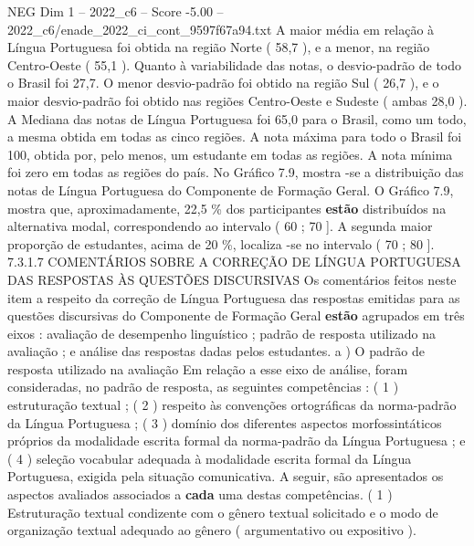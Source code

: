\begin{textsample}{NEG Dim 1 – 2022\_c6 – Score -5.00 – 2022\_c6/enade\_2022\_ci\_cont\_9597f67a94.txt}
A maior média em relação à Língua Portuguesa foi obtida na região Norte ( 58,7 ), e a menor, na região Centro-Oeste ( 55,1 ).
Quanto à variabilidade das notas, o desvio-padrão de todo o Brasil foi 27,7.
O menor desvio-padrão foi obtido na região Sul ( 26,7 ), e o maior desvio-padrão foi obtido nas regiões Centro-Oeste e Sudeste ( ambas 28,0 ).
A Mediana das notas de Língua Portuguesa foi 65,0 para o Brasil, como um todo, a mesma obtida em todas as cinco regiões.
A nota máxima para todo o Brasil foi 100, obtida por, pelo menos, um estudante em todas as regiões.
A nota mínima foi zero em todas as regiões do país.
No Gráfico 7.9, mostra -se a distribuição das notas de Língua Portuguesa do Componente de Formação Geral.
O Gráfico 7.9, mostra que, aproximadamente, 22,5 \% dos participantes \textbf{estão} distribuídos na alternativa modal, correspondendo ao intervalo ( 60 ; 70 ].
A segunda maior proporção de estudantes, acima de 20 \%, localiza -se no intervalo ( 70 ; 80 ]. 7.3.1.7 COMENTÁRIOS SOBRE A CORREÇÃO DE LÍNGUA PORTUGUESA DAS RESPOSTAS ÀS QUESTÕES DISCURSIVAS Os comentários feitos neste item a respeito da correção de Língua Portuguesa das respostas emitidas para as questões discursivas do Componente de Formação Geral \textbf{estão} agrupados em três eixos : avaliação de desempenho linguístico ; padrão de resposta utilizado na avaliação ; e análise das respostas dadas pelos estudantes. a ) O padrão de resposta utilizado na avaliação Em relação a esse eixo de análise, foram consideradas, no padrão de resposta, as seguintes competências : ( 1 ) estruturação textual ; ( 2 ) respeito às convenções ortográficas da norma-padrão da Língua Portuguesa ; ( 3 ) domínio dos diferentes aspectos morfossintáticos próprios da modalidade escrita formal da norma-padrão da Língua Portuguesa ; e ( 4 ) seleção vocabular adequada à modalidade escrita formal da Língua Portuguesa, exigida pela situação comunicativa.
A seguir, são apresentados os aspectos avaliados associados a \textbf{cada} uma destas competências. ( 1 ) Estruturação textual condizente com o gênero textual solicitado e o modo de organização textual adequado ao gênero ( argumentativo ou expositivo ).

\end{textsample}

